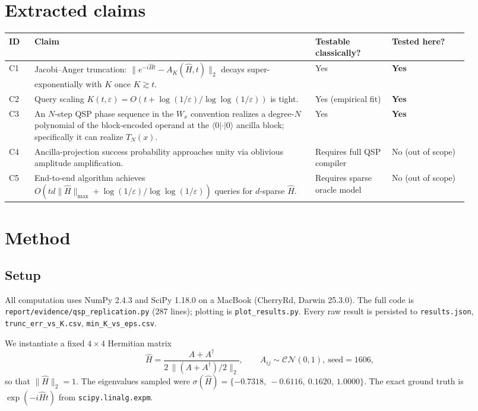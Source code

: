 \documentclass[11pt]{article}
\begin{document}
\section{Extracted claims}
\begin{tabular}{@{}p{0.05\linewidth}p{0.55\linewidth}p{0.15\linewidth}p{0.15\linewidth}@{}}
\toprule
ID & Claim & Testable classically? & Tested here? \\
\midrule
C1 & Jacobi--Anger truncation:
     $\|e^{-i\hat H t}-A_K(\hat H,t)\|_2$ decays
     super-exponentially with $K$ once $K\gtrsim t$. & Yes & \textbf{Yes} \\
C2 & Query scaling $K(t,\varepsilon)=O(t+\log(1/\varepsilon)/\log\log(1/\varepsilon))$
     is tight. & Yes (empirical fit) & \textbf{Yes} \\
C3 & An $N$-step QSP phase sequence in the $W_x$ convention realizes a
     degree-$N$ polynomial of the block-encoded operand at the $\langle 0|\cdot|0\rangle$
     ancilla block; specifically it can realize $T_N(x)$. & Yes & \textbf{Yes} \\
C4 & Ancilla-projection success probability approaches unity via oblivious
     amplitude amplification. & Requires full QSP compiler & No (out of scope) \\
C5 & End-to-end algorithm achieves $O(t d\|\hat H\|_{\max}+\log(1/\varepsilon)/\log\log(1/\varepsilon))$
     queries for $d$-sparse $\hat H$. & Requires sparse oracle model & No (out of scope) \\
\bottomrule
\end{tabular}

\section{Method}

\subsection{Setup}
All computation uses NumPy 2.4.3 and SciPy 1.18.0 on a MacBook (CherryRd,
Darwin 25.3.0). The full code is \texttt{report/evidence/qsp\_replication.py}
(287 lines); plotting is \texttt{plot\_results.py}. Every raw result is
persisted to \texttt{results.json}, \texttt{trunc\_err\_vs\_K.csv},
\texttt{min\_K\_vs\_eps.csv}.

We instantiate a fixed $4\times4$ Hermitian matrix
\[
  \hat H = \frac{A+A^{\dagger}}{2\,\|(A+A^\dagger)/2\|_2},
  \qquad A_{ij}\sim\mathcal{CN}(0,1),\ \mathrm{seed}=1606,
\]
so that $\|\hat H\|_2 = 1$. The eigenvalues sampled were
$\sigma(\hat H) = \{-0.7318,\ -0.6116,\ 0.1620,\ 1.0000\}$.
The exact ground truth is $\exp(-i\hat H t)$ from \texttt{scipy.linalg.expm}.
\end{document}
